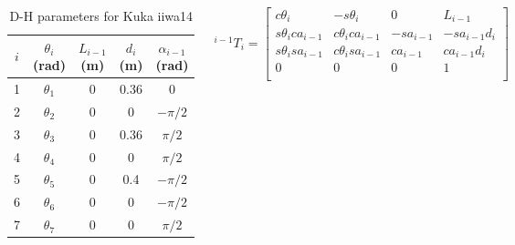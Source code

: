 \begin{frame}
\begin{columns}
\begin{figure}[htbp]
\end{figure}
\begin{table}[htbp]
\begin{center}
\begin{tabular}{ |c|c|c|c|c| } 
\hline
$i$ & $θ_i$ (rad) & $L_{i-1}$ (m) & $d_i$ (m) & $α_{i-1}$ (rad) \\
\hline
1 & $θ_1$ & 0 & 0.36 & 0 \\
2 & $θ_2$ & 0 & 0 & $-π/2$ \\
3 & $θ_3$ & 0 & 0.36 & $π/2$ \\
4 & $θ_4$ & 0 & 0 & $π/2$\\
5 & $θ_5$ & 0 & 0.4 & $-π/2$ \\
6 & $θ_6$ & 0 & 0 & $-π/2$ \\
7 & $θ_7$ & 0 & 0 & $π/2$ \\
\hline
\end{tabular}
\end{center}
\caption{D-H parameters for Kuka iiwa14}
\end{table}
\[
^{i-1}T_i = 
\begin{bmatrix}
c\theta_i & -s\theta_i & 0 & L_{i-1} \\
s\theta_ica_{i-1} & c\theta_ica_{i-1} & -sa_{i-1} & -sa_{i-1}d_i \\
s\theta_isa_{i-1} & c\theta_isa_{i-1} & ca_{i-1} & ca_{i-1}d_i \\
0 & 0 & 0 & 1\\
\end{bmatrix}
\]
\end{columns}
\end{frame}

